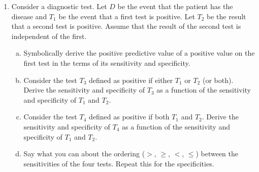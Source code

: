 \documentclass[12pt]{article}
\begin{document}
\begin{enumerate}[1.]
\newpage

\item Consider a diagnostic test. Let $D$ be the event that the
patient has the disease and $T_{1}$ be the event that a first test is
positive. Let $T_{2}$ be the result that a second test is positive. Assume
that the result of the second test is independent of the first.
\begin{enumerate}[a.]
\item Symbolically derive the positive predictive value of a positive
value on the first test in the
terms of its sensitivity and specificity. 
\item  Consider the test $T_3$ defined as positive if either $T_1$ or $T_2$
(or both).  Derive the sensitivity and specificity of $T_3$
as a function of the sensitivity and specificity of $T_1$ and $T_2$.
\item Consider the test $T_4$ defined as positive if both $T_1$ and $T_2$.
Derive the sensitivity and specificity of $T_4$ as a function
of the sensitivity and specificity of $T_1$ and $T_2$.
\item Say what you can about the ordering ($>$, $\geq$, $<$, $\leq$) between
the sensitivities of the four tests. Repeat this for the specificities.
 
\end{enumerate}

\end{enumerate}
\end{document}
